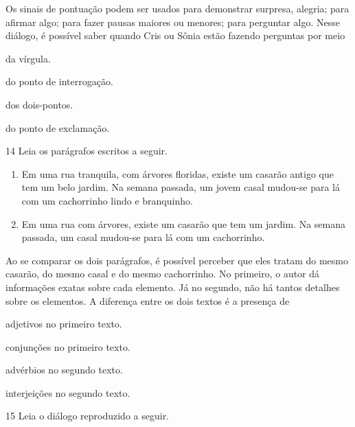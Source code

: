 Os sinais de pontuação podem ser usados para demonstrar surpresa, alegria; 
para afirmar algo; para fazer pausas maiores ou menores; para perguntar algo. 
Nesse diálogo, é possível saber quando Cris ou Sônia estão fazendo perguntas por meio

\begin{escolha}
\item da vírgula.

\item do ponto de interrogação.

\item dos dois-pontos.

\item do ponto de exclamação.
\end{escolha}


\num{14} Leia os parágrafos escritos a seguir.

\begin{myquote}
\begin{enumerate}
\item Em uma rua tranquila, com árvores floridas, existe um casarão antigo
que tem um belo jardim. Na semana passada, um jovem casal mudou-se para
lá com um cachorrinho lindo e branquinho.

\item Em uma rua com árvores, existe um casarão que tem um jardim. Na
semana passada, um casal mudou-se para lá com um cachorrinho.
\end{enumerate}
\end{myquote}

Ao se comparar os dois parágrafos, é possível perceber que eles tratam
do mesmo casarão, do mesmo casal e do mesmo cachorrinho. No primeiro, o
autor dá informações exatas sobre cada elemento. Já no segundo, não há
tantos detalhes sobre os elementos. A diferença entre os dois textos é a
presença de

\begin{escolha}
\item adjetivos no primeiro texto.

\item conjunções no primeiro texto.

\item advérbios no segundo texto.

\item interjeições no segundo texto.
\end{escolha}


\num{15} Leia o diálogo reproduzido a seguir.

